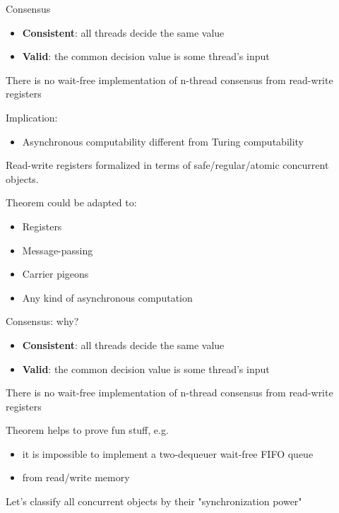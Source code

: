 \begin{frame}{Consensus}

\begin{itemize}
  \item \textbf{Consistent}: all threads decide the same value
  \item \textbf{Valid}: the common decision value is some thread's input
\end{itemize}

\pause

\begin{theorem}
  There is no wait-free implementation of n-thread consensus from read-write registers
\end{theorem}

\pause

Implication:
\begin{itemize}
  \item Asynchronous computability different from Turing computability
\end{itemize}

\pause

Read-write registers formalized in terms of safe/regular/atomic concurrent objects.

\pause

Theorem could be adapted to:

\begin{itemize}
  \item Registers
  \item Message-passing
  \item Carrier pigeons
  \item Any kind of asynchronous computation
\end{itemize}

\end{frame}


\begin{frame}{Consensus: why?}

\begin{itemize}
  \item \textbf{Consistent}: all threads decide the same value
  \item \textbf{Valid}: the common decision value is some thread's input
\end{itemize}

\begin{theorem}
  There is no wait-free implementation of n-thread consensus from read-write registers
\end{theorem}

\pause
Theorem helps to prove fun stuff, e.g. 
\begin{itemize}
  \item it is impossible to implement a two-dequeuer wait-free FIFO queue
  \item from read/write memory
\end{itemize}

\pause

Let's classify all concurrent objects by their "synchronization power"

\end{frame}

